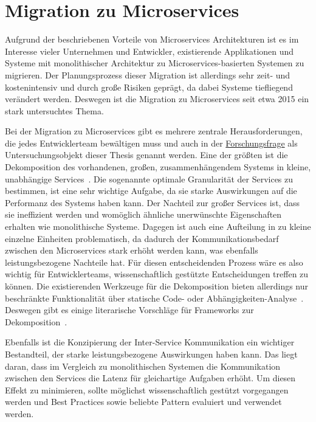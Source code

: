 \section{Migration zu Microservices}

Aufgrund der beschriebenen Vorteile von Microservices Architekturen ist es im Interesse vieler Unternehmen und Entwickler, existierende Applikationen und Systeme mit monolithischer Architektur zu Microservices-basierten Systemen zu migrieren.
Der Planungsprozess dieser Migration ist allerdings sehr zeit- und kostenintensiv und durch große Risiken geprägt, da dabei Systeme tiefliegend verändert werden.
Deswegen ist die Migration zu Microservices seit etwa 2015 ein stark untersuchtes Thema.

Bei der Migration zu Microservices gibt es mehrere zentrale Herausforderungen, die jedes Entwicklerteam bewältigen muss und auch in der \hyperref[forschungsfrage:1]{Forschungsfrage} als Untersuchungsobjekt dieser Thesis genannt werden.
Eine der größten ist die Dekomposition des vorhandenen, großen, zusammenhängendem Systems in kleine, unabhängige Services~\cite{a-survey-on,taibi2017processmotivations,taibi2019decomposition}.
Die sogenannte optimale Granularität der Services zu bestimmen, ist eine sehr wichtige Aufgabe, da sie starke Auswirkungen auf die Performanz des Systems haben kann.
Der Nachteil zur großer Services ist, dass sie ineffizient werden und womöglich ähnliche unerwünschte Eigenschaften erhalten wie monolithische Systeme.
Dagegen ist auch eine Aufteilung in zu kleine einzelne Einheiten problematisch, da dadurch der Kommunikationsbedarf zwischen den Microservices stark erhöht werden kann, was ebenfalls leistungsbezogene Nachteile hat.
Für diesen entscheidenden Prozess wäre es also wichtig für Entwicklerteams, wissenschaftlich gestützte Entscheidungen treffen zu können.
Die existierenden Werkzeuge für die Dekomposition bieten allerdings nur beschränkte Funktionalität über statische Code- oder Abhängigkeiten-Analyse~\cite{a-survey-on}.
Deswegen gibt es einige literarische Vorschläge für Frameworks zur Dekomposition~\cite{taibi2019decomposition,taibi2019monolithic}.

Ebenfalls ist die Konzipierung der Inter-Service Kommunikation ein wichtiger Bestandteil, der starke leistungsbezogene Auswirkungen haben kann.
Das liegt daran, dass im Vergleich zu monolithischen Systemen die Kommunikation zwischen den Services die Latenz für gleichartige Aufgaben erhöht.
Um diesen Effekt zu minimieren, sollte möglichst wissenschaftlich gestützt vorgegangen werden und Best Practices sowie beliebte Pattern evaluiert und verwendet werden.

